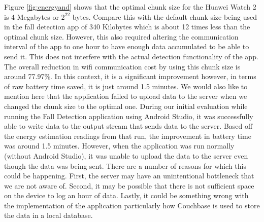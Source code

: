Figure \ref{fig:energyand} shows that the optimal chunk size for the Huawei Watch 2 is 4 Megabytes or $2^{22}$ bytes. Compare this with 
the default chunk size being used in the fall detection app of 340 Kilobytes which is about 12 times less than the optimal chunk size. 
However, this also required altering the communication interval of the app to one hour to have enough data accumulated to be able to send it.
This does not interfere with the actual detection functionality of the app. The overall reduction in wifi communication cost by using this 
chunk size is around 77.97\%. In this context, it is a significant improvement however, in terms of raw battery time saved, it is just around 
1.5 minutes. We would also like to mention here that the application failed to upload data to the server when we 
changed the chunk size to the optimal one. During our initial evaluation while running the Fall Detection application 
using Android Studio, it was successfully able to write data to the output stream that sends data to the server. Based off 
the energy estimation readings from that run, the improvement in battery time was around 1.5 minutes. However, when the 
application was run normally (without Android Studio), it was unable to upload the data to the server even though the 
data was being sent. There are a number of reasons for which this could be happening. First, the server may have an 
unintentional bottleneck that we are not aware of. Second, it may be possible that there is not sufficient 
space on the device to log an hour of data. Lastly, it could be something wrong with the implementation of the 
application \textemdash particularly how Couchbase is used to store the data in a local database. \\ 

